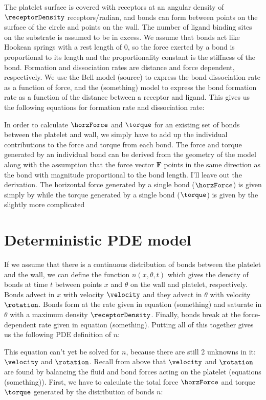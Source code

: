 The platelet surface is covered with receptors at an angular density
of $\receptorDensity$ receptors/radian, and bonds can form between
points on the surface of the circle and points on the wall. The number
of ligand binding sites on the substrate is assumed to be in
excess. We assume that bonds act like Hookean springs with a rest
length of 0, so the force exerted by a bond is proportional to its
length and the proportionality constant is the stiffness of the
bond. Formation and dissociation rates are distance and force
dependent, respectively. We use the Bell model (source) to express the
bond dissociation rate as a function of force, and the (something)
model to express the bond formation rate as a function of the distance
between a receptor and ligand. This gives us the following equations
for formation rate and dissociation rate:

In order to calculate $\horzForce$ and $\torque$ for an existing set
of bonds between the platelet and wall, we simply have to add up the
individual contributions to the force and torque from each bond. The
force and torque generated by an individual bond can be derived from
the geometry of the model along with the assumption that the force
vector $\mathbf{F}$ points in the same direction as the bond with
magnitude proportional to the bond length. I'll leave out the
derivation. The horizontal force generated by a single bond
($\horzForce$) is given simply by
while the torque generated by a single bond ($\torque$) is given by
the slightly more complicated

\section{Deterministic PDE model}
\label{sec:determ-pde-model}

If we assume that there is a continuous distribution of bonds between
the platelet and the wall, we can define the function $n(x, \theta,
t)$ which gives the density of bonds at time $t$ between points $x$
and $\theta$ on the wall and platelet, respectively. Bonds advect in
$x$ with velocity $\velocity$ and they advect in $\theta$ with
velocity $\rotation$. Bonds form at the rate given in equation
(something) and saturate in $\theta$ with a maximum density
$\receptorDensity$. Finally, bonds break at the force-dependent rate
given in equation (something). Putting all of this together gives us
the following PDE definition of $n$:

This equation can't yet be solved for $n$, because there are still 2
unknowns in it: $\velocity$ and $\rotation$. Recall from above that
$\velocity$ and $\rotation$ are found by balancing the fluid and bond
forces acting on the platelet (equations (something)). First, we have
to calculate the total force $\horzForce$ and torque $\torque$
generated by the distribution of bonds $n$:

